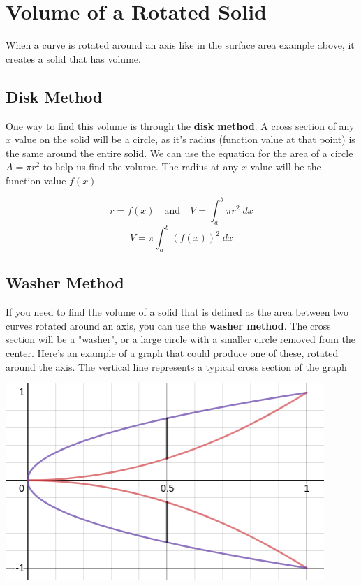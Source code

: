 \documentclass[12pt]{report}
\begin{document}
\section{Volume of a Rotated Solid}
When a curve is rotated around an axis like in the surface area example above, it creates a solid that has volume.

\subsection{Disk Method}
One way to find this volume is through the \textbf{disk method}. A cross section of any $x$ value on the solid will be a circle, as it's radius (function value at that point) is the same around the entire solid. We can use the equation for the area of a circle $A = \pi r^2$ to help us find the volume. The radius at any $x$ value will be the function value $f(x)$

$$ r = f(x) \quad \text{and} \quad V = \int_a^b \pi r^2 \; dx $$
$$ V = \pi \int_a^b (f(x))^2 \; dx $$

\subsection{Washer Method}
If you need to find the volume of a solid that is defined as the area between two curves rotated around an axis, you can use the \textbf{washer method}. The cross section will be a "washer", or a large circle with a smaller circle removed from the center. Here's an example of a graph that could produce one of these, rotated around the axis. The vertical line represents a typical cross section of the graph

\begin{center}
\includegraphics[scale=0.4]{washer_method}
\end{center}
\end{document}

